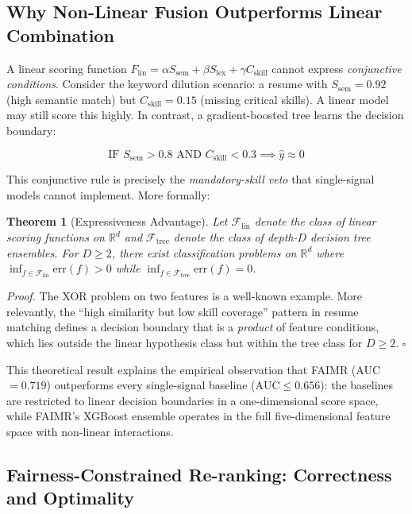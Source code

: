 \documentclass[smallcondensed,numbers]{sn-jnl}
\newtheorem{theorem}{Theorem}
\begin{document}
\subsection{Why Non-Linear Fusion Outperforms Linear Combination}

A linear scoring function $F_\text{lin} = \alpha S_\text{sem} + \beta S_\text{lex} + \gamma C_\text{skill}$ cannot express \textit{conjunctive conditions}. Consider the keyword dilution scenario: a resume with $S_\text{sem} = 0.92$ (high semantic match) but $C_\text{skill} = 0.15$ (missing critical skills). A linear model may still score this highly. In contrast, a gradient-boosted tree learns the decision boundary:

\begin{equation}
    \text{IF } S_\text{sem} > 0.8 \text{ AND } C_\text{skill} < 0.3 \implies \hat{y} \approx 0
\end{equation}

This conjunctive rule is precisely the \textit{mandatory-skill veto} that single-signal models cannot implement. More formally:

\begin{theorem}[Expressiveness Advantage]\label{thm:express}
Let $\mathcal{F}_\text{lin}$ denote the class of linear scoring functions on $\mathbb{R}^d$ and $\mathcal{F}_\text{tree}$ denote the class of depth-$D$ decision tree ensembles. For $D \geq 2$, there exist classification problems on $\mathbb{R}^d$ where $\inf_{f \in \mathcal{F}_\text{lin}} \text{err}(f) > 0$ while $\inf_{f \in \mathcal{F}_\text{tree}} \text{err}(f) = 0$.
\end{theorem}

\textit{Proof.} The XOR problem on two features is a well-known example. More relevantly, the ``high similarity but low skill coverage'' pattern in resume matching defines a decision boundary that is a \textit{product} of feature conditions, which lies outside the linear hypothesis class but within the tree class for $D \geq 2$. \hfill $\square$

This theoretical result explains the empirical observation that FAIMR (AUC~$= 0.719$) outperforms every single-signal baseline ($\text{AUC} \leq 0.656$): the baselines are restricted to linear decision boundaries in a one-dimensional score space, while FAIMR's XGBoost ensemble operates in the full five-dimensional feature space with non-linear interactions.

\subsection{Fairness-Constrained Re-ranking: Correctness and Optimality}
\label{sec:fcr_theory}
\end{document}
